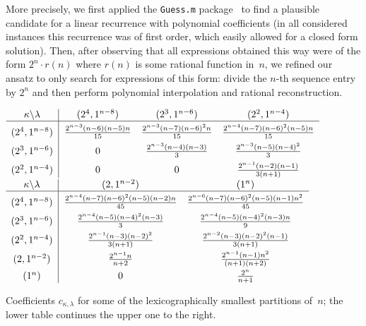 \documentclass[smallextended]{svjour3}
\begin{document}
More precisely, we first applied the \texttt{Guess.m} package~\cite{Guess} to
find a plausible candidate for a linear recurrence with polynomial
coefficients (in all considered instances this recurrence was of first order,
which easily allowed for a closed form solution). Then, after observing that
all expressions obtained this way were of the form $2^n\cdot r(n)$ where
$r(n)$ is some rational function in~$n$, we refined our ansatz to only search
for expressions of this form: divide the $n$-th sequence entry by $2^n$ and
then perform polynomial interpolation and rational reconstruction.
\begin{table}
\begin{center}
\parbox{0.85\textwidth}{
$
  \begin{array}{c@{\;\;}|@{\;\;}c@{\quad}c@{\quad}c}
    \kappa\backslash\lambda
    & (2^4,1^{n-8}) & (2^3,1^{n-6}) & (2^2,1^{n-4})
    \\ \hline
    \rule{0pt}{14pt}
    (2^4,1^{n-8})
    & \frac{2^{n-3} (n-6) (n-5) n}{15}
    & \frac{2^{n-3} (n-7) (n-6)^2 n}{15}
    & \frac{2^{n-4} (n-7) (n-6)^2 (n-5) n}{15}
    \\[1ex]
    (2^3,1^{n-6})
    & 0
    & \frac{2^{n-3} (n-4) (n-3)}{3}
    & \frac{2^{n-3} (n-5) (n-4)^2}{3}
    \\[1ex]
    (2^2,1^{n-4})
    & 0 & 0
    & \frac{2^{n-1} (n-2) (n-1)}{3 (n+1)}
  \end{array}
$ \\[1ex]
$
  \begin{array}{c@{\;\;}|@{\;\;}c@{\quad}c}
    \kappa\backslash\lambda
    & (2,1^{n-2}) & (1^n) \\ \hline
    \rule{0pt}{14pt}
    (2^4,1^{n-8})
    & \frac{2^{n-4} (n-7) (n-6)^2 (n-5) (n-2) n}{45}
    & \frac{2^{n-6} (n-7) (n-6)^2 (n-5) (n-1) n^2}{45}
    \\[1ex]
    (2^3,1^{n-6})
    & \frac{2^{n-4} (n-5) (n-4)^2 (n-3)}{3}
    & \frac{2^{n-4} (n-5) (n-4)^2 (n-3) n}{9}
    \\[1ex]
    (2^2,1^{n-4})
    & \frac{2^{n-1} (n-3) (n-2)^2}{3 (n+1)}
    & \frac{2^{n-2} (n-3) (n-2)^2 (n-1)}{3 (n+1)}
    \\[1ex]
    (2,1^{n-2})
    & \frac{2^{n-1} n}{n+2}
    & \frac{2^{n-1} (n-1) n^2}{(n+1) (n+2)}
    \\[1ex]
    (1^n)
    & 0 & \frac{2^n}{n+1}
  \end{array}
$
}
\end{center}
\caption{Coefficients $c_{\kappa,\lambda}$ for some of the lexicographically
  smallest partitions of~$n$; the lower table continues the upper one to the
  right.}
\label{tab:cn2}
\vspace{-10bp}
\end{table}
\end{document}
